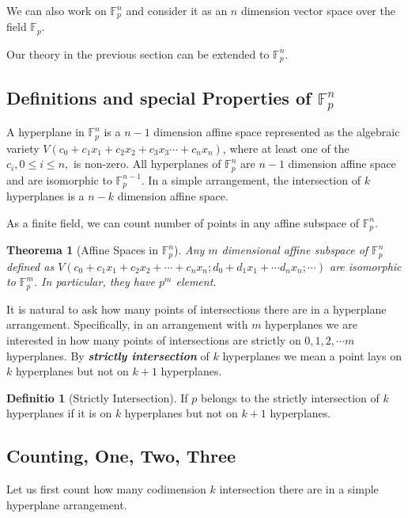 \documentclass[12pt, a4paper]{article}
\newtheorem{theorem}{Theorema}[subsection]
\theoremstyle{definition}
\newtheorem{definition}{Definitio}[section]
\theoremstyle{remark}
\renewcommand{\emph}[1]{\textit{\textbf{#1}}}
\begin{document}
We can also work on $\mathbb{F}_p^n$ and consider it as an $n$ dimension vector space over the field $\mathbb{F}_p$. 

Our theory in the previous section can be extended to $\mathbb{F}_p^n$.

\subsection{Definitions and special Properties of $\mathbb{F}_p^n$}

A hyperplane in $\mathbb{F}_p^n$ is a $n-1$ dimension affine space represented as the algebraic variety $V(c_0 + c_1x_1 + c_2x_2 + c_3x_3 \cdots + c_nx_n)$, where at least one of the $c_i, 0 \leq i \leq n,$ is non-zero. 
All hyperplanes of $\mathbb{F}_p^n$ are $n-1$ dimension affine space and are isomorphic to $\mathbb{F}_p^{n-1}$. In a simple arrangement, the intersection of $k$ hyperplanes is a $n-k$ dimension affine space.

As a finite field, we can count number of points in any affine subspace of $\mathbb{F}_p^n$. 

\begin{theorem}[Affine Spaces in $\mathbb{F}_p^n$]
	Any $m$ dimensional affine subspace of $\mathbb{F}_p^n$ defined as $V(c_0 + c_1x_1+c_2x_2 + \cdots + c_nx_n; d_0 + d_1x_1 + \cdots d_nx_n; \cdots)$ are isomorphic to $\mathbb{F}_p^m$. In particular, they have $p^m$ element.
\end{theorem}

It is natural to ask how many points of intersections there are in a hyperplane arrangement. 
Specifically, in an arrangement with $m$ hyperplanes we are interested in how many points of intersections are strictly on $0, 1, 2, \cdots m$ hyperplanes. 
By \emph{strictly intersection} of $k$ hyperplanes we mean a point lays on $k$ hyperplanes but not on $k+1$ hyperplanes. 

\begin{definition}[Strictly Intersection]
	If $p$ belongs to the strictly intersection of $k$ hyperplanes if it is on $k$ hyperplanes but not on $k+1$ hyperplanes.
\end{definition}

\subsection{Counting, One, Two, Three}

Let us first count how many codimension $k$ intersection there are in a simple hyperplane arrangement.
\end{document}
